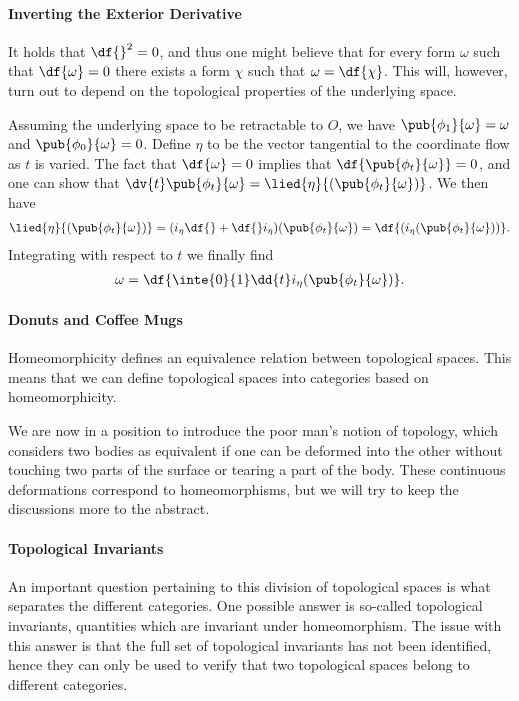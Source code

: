 \paragraph{Inverting the Exterior Derivative}
It holds that $\df{}^{2} = 0$, and thus one might believe that for every form $\omega$ such that $\df{\omega} = 0$ there exists a form $\chi$ such that $\omega = \df{\chi}$. This will, however, turn out to depend on the topological properties of the underlying space.

Assuming the underlying space to be retractable to $O$, we have $\pub{\phi_{1}}{\omega} = \omega$ and $\pub{\phi_{0}}{\omega} = 0$. Define $\eta$ to be the vector tangential to the coordinate flow as $t$ is varied. The fact that $\df{\omega} = 0$ implies that $\df{\pub{\phi_{t}}{\omega}} = 0$, and one can show that $\dv{t}\pub{\phi_{t}}{\omega} = \lied{\eta}{(\pub{\phi_{t}}{\omega})}$. We then have
\begin{align*}
	\lied{\eta}{(\pub{\phi_{t}}{\omega})} = (i_{\eta}\df{} + \df{}i_{\eta})(\pub{\phi_{t}}{\omega}) = \df{(i_{\eta}(\pub{\phi_{t}}{\omega}))}.
\end{align*}
Integrating with respect to $t$ we finally find
\begin{align*}
	\omega = \df{\inte{0}{1}\dd{t}i_{\eta}(\pub{\phi_{t}}{\omega})}.
\end{align*}

\paragraph{Donuts and Coffee Mugs}
Homeomorphicity defines an equivalence relation between topological spaces. This means that we can define topological spaces into categories based on homeomorphicity.

We are now in a position to introduce the poor man's notion of topology, which considers two bodies as equivalent if one can be deformed into the other without touching two parts of the surface or tearing a part of the body. These continuous deformations correspond to homeomorphisms, but we will try to keep the discussions more to the abstract.

\paragraph{Topological Invariants}
An important question pertaining to this division of topological spaces is what separates the different categories. One possible answer is so-called topological invariants, quantities which are invariant under homeomorphism. The issue with this answer is that the full set of topological invariants has not been identified, hence they can only be used to verify that two topological spaces belong to different categories.

